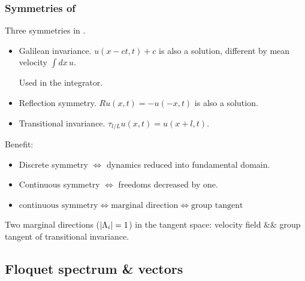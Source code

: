 \documentclass[mathserif, handout]{beamer}
\begin{document}
\begin{frame}
  \frametitle{Symmetries of \KSe}
  Three symmetries in \KSe.
  \begin{itemize}
  \item {\color{cyan} Galilean invariance}.
    $u(x-ct,t)+c$ is also a solution, different by mean velocity
    $\int dx\, u$.

    {\color{red} Used} in the integrator.

  \item {\color{cyan} Reflection symmetry}.
  $Ru(x,t)=-u(-x,t)$ is also a solution.

  \item {\color{cyan} Transitional invariance}. 
    $\tau_{l/L}u(x,t)=u(x+l,t)$.
  \end{itemize}
  
  \pause
  
  {\color{green} Benefit}: 
  \begin{itemize}
  \item  Discrete symmetry $\Leftrightarrow$ dynamics reduced into 
    fundamental domain.
  \item   Continuous symmetry $\Leftrightarrow$ freedoms decreased by one.

  \item   
    $
    \text{continuous symmetry} \Leftrightarrow
    \text{marginal direction} \Leftrightarrow
    \text{group tangent} 
    $
  \end{itemize}

  \pause 

  \begin{exampleblock}{Two marginal directions ($|\Lambda_{i}|=1$) in the
      tangent space:}
  velocity field \quad \&\& \quad group tangent of transitional invariance.
  \end{exampleblock}

\end{frame}

\subsection{Floquet spectrum \& vectors}
\end{document}

